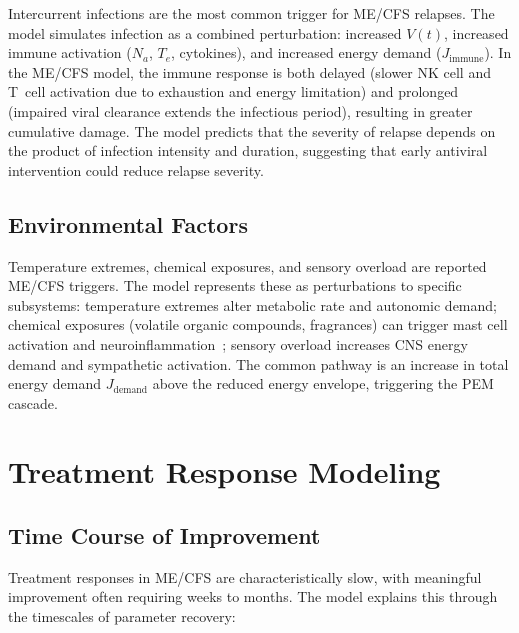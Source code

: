 Intercurrent infections are the most common trigger for ME/CFS relapses. The model simulates infection as a combined perturbation: increased $V(t)$, increased immune activation ($N_a$, $T_e$, cytokines), and increased energy demand ($J_{\text{immune}}$). In the ME/CFS model, the immune response is both delayed (slower NK cell and T~cell activation due to exhaustion and energy limitation) and prolonged (impaired viral clearance extends the infectious period), resulting in greater cumulative damage. The model predicts that the severity of relapse depends on the product of infection intensity and duration, suggesting that early antiviral intervention could reduce relapse severity.

\subsection{Environmental Factors}
\label{sec:environmental-response}

Temperature extremes, chemical exposures, and sensory overload are reported ME/CFS triggers. The model represents these as perturbations to specific subsystems: temperature extremes alter metabolic rate and autonomic demand; chemical exposures (volatile organic compounds, fragrances) can trigger mast cell activation and neuroinflammation~\cite{Frioni2024MCAS}; sensory overload increases CNS energy demand and sympathetic activation. The common pathway is an increase in total energy demand $J_{\text{demand}}$ above the reduced energy envelope, triggering the PEM cascade.

\section{Treatment Response Modeling}
\label{sec:treatment-response-modeling}

\subsection{Time Course of Improvement}
\label{sec:improvement-timecourse}

Treatment responses in ME/CFS are characteristically slow, with meaningful improvement often requiring weeks to months. The model explains this through the timescales of parameter recovery:

